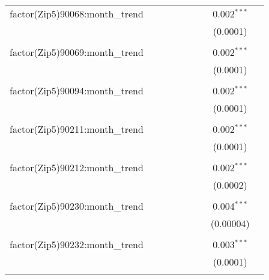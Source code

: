 \begin{table}[H]
{\begin{tabular}{@{\extracolsep{5pt}}lcccccccc}
  factor(Zip5)90068:month\_trend &  &  &  &  &  &  & 0.002$^{***}$ &  \\  

   &  &  &  &  &  &  & (0.0001) &  \\  

   & & & & & & & & \\  

  factor(Zip5)90069:month\_trend &  &  &  &  &  &  & 0.002$^{***}$ &  \\  

   &  &  &  &  &  &  & (0.0001) &  \\  

   & & & & & & & & \\  

  factor(Zip5)90094:month\_trend &  &  &  &  &  &  & 0.002$^{***}$ &  \\  

   &  &  &  &  &  &  & (0.0001) &  \\  

   & & & & & & & & \\  

  factor(Zip5)90211:month\_trend &  &  &  &  &  &  & 0.002$^{***}$ &  \\  

   &  &  &  &  &  &  & (0.0001) &  \\  

   & & & & & & & & \\  

  factor(Zip5)90212:month\_trend &  &  &  &  &  &  & 0.002$^{***}$ &  \\  

   &  &  &  &  &  &  & (0.0002) &  \\  

   & & & & & & & & \\  

  factor(Zip5)90230:month\_trend &  &  &  &  &  &  & 0.004$^{***}$ &  \\  

   &  &  &  &  &  &  & (0.00004) &  \\  

   & & & & & & & & \\  

  factor(Zip5)90232:month\_trend &  &  &  &  &  &  & 0.003$^{***}$ &  \\  

   &  &  &  &  &  &  & (0.0001) &  \\  

   & & & & & & & & \\  


\end{tabular}}
\end{table}
